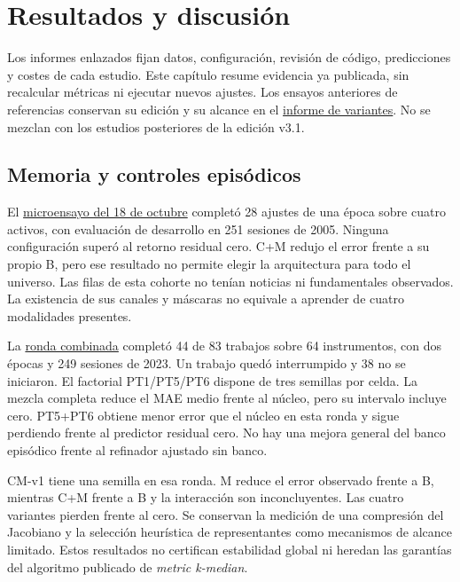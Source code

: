 \documentclass[11pt,a4paper]{report}
\begin{document}
\chapter{Resultados y discusión}
\label{cap:resultados}
Los informes enlazados fijan datos, configuración, revisión de código,
predicciones y costes de cada estudio. Este capítulo resume evidencia ya
publicada, sin recalcular métricas ni ejecutar nuevos ajustes. Los ensayos
anteriores de referencias conservan su edición y su alcance en el
\href{https://github.com/GonxKZ/mars-titan/blob/8b7e2a5600be568cc1299f2a661da15b5090c45e/reports/baselines/reference-variants.md}{informe de variantes}.
No se mezclan con los estudios posteriores de la edición v3.1.

\section{Memoria y controles episódicos}
El \href{https://github.com/GonxKZ/mars-titan/blob/8b7e2a5600be568cc1299f2a661da15b5090c45e/reports/research/memory-microstudy-20261018/README.md}{microensayo del 18 de octubre}
completó 28 ajustes de una época sobre cuatro activos, con evaluación de
desarrollo en 251 sesiones de 2005. Ninguna configuración superó al retorno
residual cero. C+M redujo el error frente a su propio B, pero ese resultado no
permite elegir la arquitectura para todo el universo. Las filas de esta
cohorte no tenían noticias ni fundamentales observados. La existencia de sus
canales y máscaras no equivale a aprender de cuatro modalidades presentes.

La \href{https://github.com/GonxKZ/mars-titan/blob/8b7e2a5600be568cc1299f2a661da15b5090c45e/reports/research/combined-memory-20261018/README.md}{ronda combinada}
completó 44 de 83 trabajos sobre 64 instrumentos, con dos épocas y 249 sesiones
de 2023. Un trabajo quedó interrumpido y 38 no se iniciaron. El factorial
PT1/PT5/PT6 dispone de tres semillas por celda. La mezcla completa reduce el
MAE medio frente al núcleo, pero su intervalo incluye cero. PT5+PT6 obtiene
menor error que el núcleo en esta ronda y sigue perdiendo frente al predictor
residual cero. No hay una mejora general del banco episódico frente al
refinador ajustado sin banco.

CM-v1 tiene una semilla en esa ronda. M reduce el error observado frente a B,
mientras C+M frente a B y la interacción son inconcluyentes. Las cuatro
variantes pierden frente al cero. Se conservan la medición de una compresión
del Jacobiano y la selección heurística de representantes como mecanismos de
alcance limitado. Estos resultados no certifican estabilidad global ni
heredan las garantías del algoritmo publicado de \emph{metric k-median}.
\end{document}
